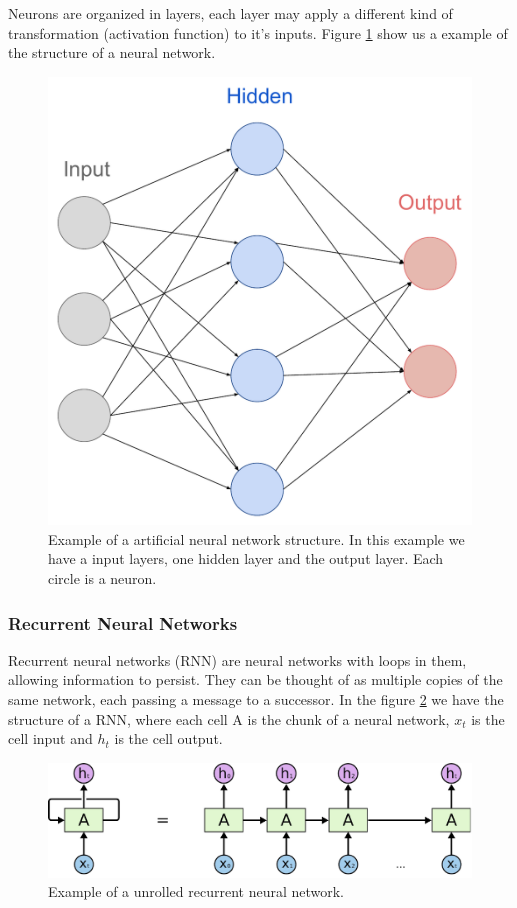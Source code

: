 \documentclass[12pt]{report}
\begin{document}
Neurons are organized in layers, each layer may apply a different kind of transformation (activation function) to it's inputs. Figure \ref{fig:ann} show us a example of the structure of a neural network.

\begin{figure}[!ht]
\centering
\includegraphics[scale=0.4]{ann.pdf}
\caption{Example of a artificial neural network structure. In this example we have a input layers, one hidden layer and the output layer. Each circle is a neuron.}
\label{fig:ann}
\end{figure}


\subsubsection{Recurrent Neural Networks}

Recurrent neural networks (RNN) are neural networks with loops in them, allowing information to persist. They can be thought of as multiple copies of the same network, each passing a message to a successor. In the figure \ref{fig:rnn} we have the structure of a RNN, where each cell A is the chunk of a neural network,  $x_t$ is the cell input and $h_t$ is the cell output.

\begin{figure}[!ht]
\centering
\includegraphics[scale=0.35]{rnn.pdf}
\caption{Example of a unrolled recurrent neural network.}
\label{fig:rnn}
\end{figure}
\end{document}
